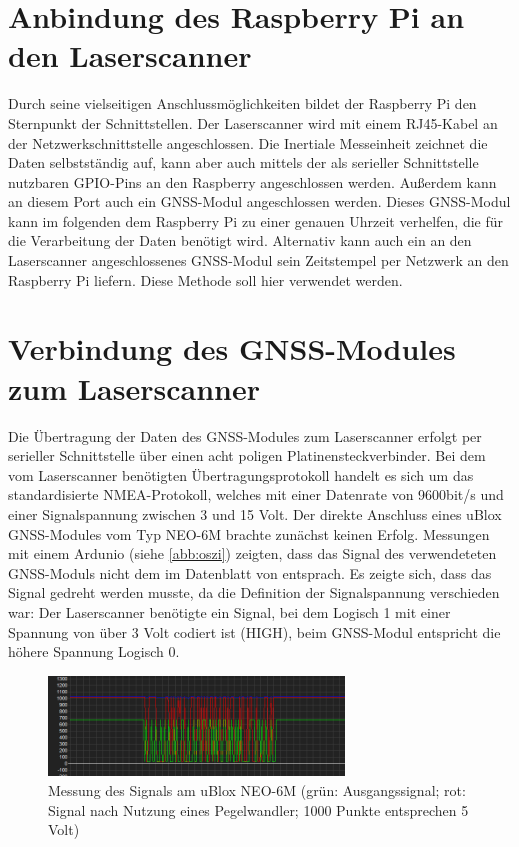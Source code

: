 \documentclass[a4paper,12pt,bibliography=totoc, listof=totoc,titlepage,pointlessnumbers]{scrreprt}
\begin{document}
\section{Anbindung des Raspberry Pi an den Laserscanner}
Durch seine vielseitigen Anschlussmöglichkeiten bildet der Raspberry Pi den Sternpunkt der Schnittstellen. Der Laserscanner wird mit einem RJ45-Kabel an der Netzwerkschnittstelle angeschlossen. Die Inertiale Messeinheit zeichnet die Daten selbstständig auf, kann aber auch mittels der als serieller Schnittstelle nutzbaren GPIO-Pins an den Raspberry angeschlossen werden. Außerdem kann an diesem Port auch ein GNSS-Modul angeschlossen werden. Dieses GNSS-Modul kann im folgenden dem Raspberry Pi zu einer genauen Uhrzeit verhelfen, die für die Verarbeitung der Daten benötigt wird. Alternativ kann auch ein an den Laserscanner angeschlossenes GNSS-Modul sein Zeitstempel per Netzwerk an den Raspberry Pi liefern. Diese Methode soll hier verwendet werden.

\section{Verbindung des GNSS-Modules zum Laserscanner}
\label{s:GNSSAnschluss}
Die Übertragung der Daten des GNSS-Modules zum Laserscanner erfolgt per serieller Schnittstelle über einen acht poligen Platinensteckverbinder. Bei dem vom Laserscanner benötigten Übertragungsprotokoll handelt es sich um das standardisierte NMEA-Protokoll, welches mit einer Datenrate von 9600bit/s und einer Signalspannung zwischen 3 und 15 Volt. Der direkte Anschluss eines uBlox GNSS-Modules vom Typ NEO-6M brachte zunächst keinen Erfolg. Messungen mit einem Ardunio (siehe \autoref{abb:oszi}) zeigten, dass das Signal des verwendeteten GNSS-Moduls nicht dem im Datenblatt von \citet[S. 3]{vlpInterface} entsprach. Es zeigte sich, dass das Signal gedreht werden musste, da die Definition der Signalspannung verschieden war: Der Laserscanner benötigte ein Signal, bei dem Logisch 1 mit einer Spannung von über 3 Volt \citep[S. 3]{vlpInterface} codiert ist (HIGH), beim GNSS-Modul entspricht  die höhere Spannung Logisch 0.

\begin{figure}[ht!]
 \centering
 \includegraphics[width=0.7\textwidth]{img/oszi.png}
 \caption{Messung des Signals am uBlox NEO-6M (grün: Ausgangssignal; rot: Signal nach Nutzung eines Pegelwandler; 1000 Punkte entsprechen 5 Volt)}
 \label{abb:oszi}
\end{figure}
\end{document}
